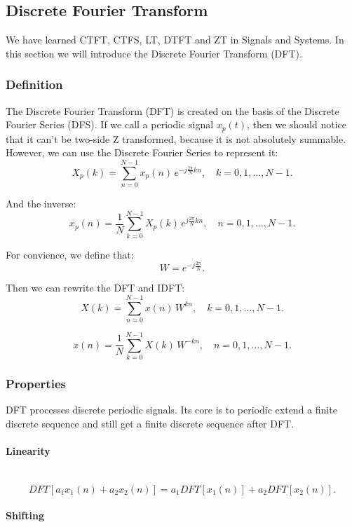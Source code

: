 \documentclass[12pt]{ctexart}
\begin{document}
\fontsize{12}{14}
\newpage
\subsection{\textbf{Discrete Fourier Transform}}

We have learned CTFT, CTFS, LT, DTFT and ZT in Signals and Systems. In this section
we will introduce the Discrete Fourier Transform (DFT).

\subsubsection{\textbf{Definition}}

The Discrete Fourier Transform (DFT) is created on the basis of the Discrete
Fourier Series (DFS). If we call a periodic signal $x_p(t)$, then we should notice
that it can't be two-side Z transformed, because it is not absolutely summable.
However, we can use the Discrete Fourier Series to represent it:
\[
  X_p(k) = \sum_{n=0}^{N-1} x_p(n)\,e^{-j\frac{2\pi}{N}kn},\quad k=0,1,\dots,N-1.
\]

And the inverse:
\[
  x_p(n) = \frac{1}{N}\sum_{k=0}^{N-1} X_p(k)\,e^{j\frac{2\pi}{N}kn},\quad n=0,1,
  \dots,N-1.
\]

For convience, we define that:
\[
  W = e^{-j\frac{2\pi}{N}}.
\]

Then we can rewrite the DFT and IDFT:
\[
  X(k) = \sum_{n=0}^{N-1} x(n)\,W^{kn},\quad k=0,1,\dots,N-1.
\]

\[
  x(n) = \frac{1}{N}\sum_{k=0}^{N-1} X(k)\,W^{-kn},\quad n=0,1,\dots,N-1.
\]

\subsubsection{\textbf{Properties}}

DFT processes discrete periodic signals. Its core is to periodic extend a finite
discrete sequence and still get a finite discrete sequence after DFT.

\paragraph{\textbf{Linearity}}\mbox{}\\
\[
  DFT[a_1x_1(n) + a_2x_2(n)] = a_1DFT[x_1(n)] + a_2DFT[x_2(n)].
\]

\paragraph{\textbf{Shifting}}\mbox{}\\
\end{document}
